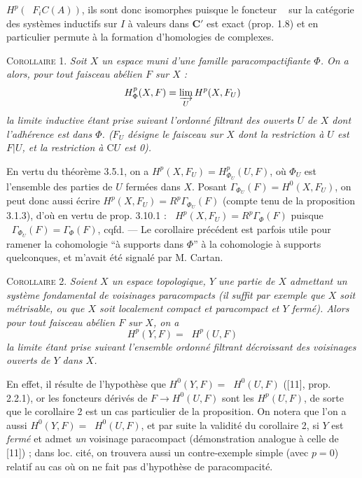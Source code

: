 
$H^p(\mathop{\underset{\to}{\lim}} F_iC(A))$, ils sont donc isomorphes puisque le foncteur
$\mathop{\underset{\to}{\lim}}$ sur la catégorie des systèmes inductifs sur $I$ à valeurs dans
$\mathbf C'$ est exact (prop. 1.8) et en particulier permute à la formation
d’homologies de complexes.

\textsc{Corollaire 1.} \textit{Soit $X$ un espace muni d'une famille
paracompactifiante $\Phi$. On a alors, pour tout faisceau abélien $F$ sur
$X$ :}
\[
H^p_{\Phi}(X,F)=\varinjlim\limits_U H^p(X,F_U)
\]
\textit{la limite inductive étant prise suivant l'ordonné filtrant des ouverts
$U$ de $X$ dont l'adhérence est dans $\Phi$. \textup{(}$F_U$ désigne le faisceau sur
$X$ dont la restriction à $U$ est $F|U$, et la restriction à $\mathrm C U$ est \textup{0)}.}

En vertu du théorème 3.5.1, on a
$H^p(X,F_U)=H^p_{\Phi_U}(U,F)$, où $\Phi_U$ est l'ensemble des parties de $U$
fermées dans $X$. Posant $\Gamma_{\Phi_U}(F)=H^0(X,F_U)$, on peut donc aussi
écrire $H^p(X,F_U)=R^p\Gamma_{\Phi_U}(F)$ (compte tenu de la
proposition 3.1.3), d'où en vertu de prop. 3.10.1 :
$\mathop{\underset{\to}{\lim}} H^p(X,F_U)=R^p\Gamma_{\Phi}(F)$ puisque
$\mathop{\underset{\to}{\lim}}\Gamma_{\Phi_U}(F)=\Gamma_{\Phi}(F)$, cqfd.
--- Le corollaire précédent est parfois utile pour ramener la cohomologie
``à supports dans $\Phi$'' à la cohomologie à supports quelconques, et m'avait
été signalé par M. Cartan.

\textsc{Corollaire 2.} \textit{Soient $X$ un espace topologique, $Y$
une partie de $X$ admettant un système fondamental de voisinages paracompacts
\textup{(}il suffit par exemple que $X$ soit métrisable, ou que $X$ soit localement compact et
paracompact et $Y$ fermé\textup{)}. Alors pour tout faisceau abélien $F$ sur $X$, on a}
\[
H^p(Y,F)=\mathop{\underset{\to}{\lim}} H^p(U,F)
\]
\textit{la limite étant prise suivant l'ensemble ordonné filtrant décroissant
des voisinages ouverts de $Y$ dans $X$.}

En effet, il résulte de l'hypothèse que
$H^0(Y,F)=\mathop{\underset{\to}{\lim}} H^0(U,F)$ ([11], prop. 2.2.1), or les foncteurs dérivés
de $F\to H^0(U,F)$ sont les $H^p(U,F)$, de sorte que le corollaire 2
est un cas particulier de la proposition. On notera que l'on a aussi
$H^0(Y,F)=\mathop{\underset{\to}{\lim}} H^0(U,F)$, et par suite la validité du corollaire 2, si
$Y$ est \textit{fermé} et admet \textit{un} voisinage paracompact
(démonstration analogue à celle de [11]) ; dans loc. cité, on trouvera aussi
un contre-exemple simple (avec $p=0$) relatif au cas où on ne fait pas
d'hypothèse de paracompacité.

